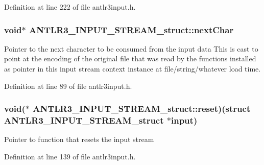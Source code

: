 Definition at line 222 of file antlr3input.\-h.

\hypertarget{struct_a_n_t_l_r3___i_n_p_u_t___s_t_r_e_a_m__struct_a782664088fb3999f4b152bf3e309bf7c}{
\subsubsection[{next\-Char}]{\setlength{\rightskip}{0pt plus 5cm}void$\ast$ A\-N\-T\-L\-R3\-\_\-\-I\-N\-P\-U\-T\-\_\-\-S\-T\-R\-E\-A\-M\-\_\-struct\-::next\-Char}}\label{struct_a_n_t_l_r3___i_n_p_u_t___s_t_r_e_a_m__struct_a782664088fb3999f4b152bf3e309bf7c}
Pointer to the next character to be consumed from the input data This is cast to point at the encoding of the original file that was read by the functions installed as pointer in this input stream context instance at file/string/whatever load time. 

Definition at line 89 of file antlr3input.\-h.

\hypertarget{struct_a_n_t_l_r3___i_n_p_u_t___s_t_r_e_a_m__struct_ac4698064b0b32eddb47f954d1c664071}{
\subsubsection[{reset}]{\setlength{\rightskip}{0pt plus 5cm}void($\ast$ A\-N\-T\-L\-R3\-\_\-\-I\-N\-P\-U\-T\-\_\-\-S\-T\-R\-E\-A\-M\-\_\-struct\-::reset)(struct {\bf A\-N\-T\-L\-R3\-\_\-\-I\-N\-P\-U\-T\-\_\-\-S\-T\-R\-E\-A\-M\-\_\-struct} $\ast$input)}}\label{struct_a_n_t_l_r3___i_n_p_u_t___s_t_r_e_a_m__struct_ac4698064b0b32eddb47f954d1c664071}
Pointer to function that resets the input stream 

Definition at line 139 of file antlr3input.\-h.

